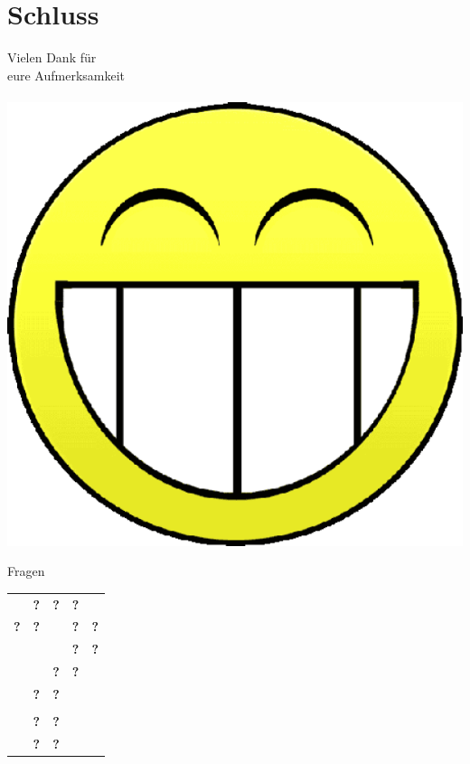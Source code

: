 \documentclass{beamer}
\begin{document}
\section{Schluss}
\begin{frame}{}
  \begin{center}
    \begin{LARGE}
      Vielen Dank für\\
      eure Aufmerksamkeit\\
      ~\\
      \includegraphics[scale=0.2]{smilie.png}
    \end{LARGE}
  \end{center}
\end{frame}

\begin{frame}{Fragen}
  \begin{center}
    \begin{LARGE}
      \begin{tabular}{ccccc}
         & \textbf{?} & \textbf{?} & \textbf{?} & \\
        \textbf{?} & \textbf{?} &  & \textbf{?} & \textbf{?}\\
         &  &  & \textbf{?} & \textbf{?}\\
         &  & \textbf{?} & \textbf{?} & \\
         & \textbf{?} & \textbf{?} &  & \\
         &  &  &  & \\
         & \textbf{?} & \textbf{?} &  & \\
         & \textbf{?} & \textbf{?} &  & 
      \end{tabular}
    \end{LARGE}
  \end{center}
\end{frame}
\end{document}

